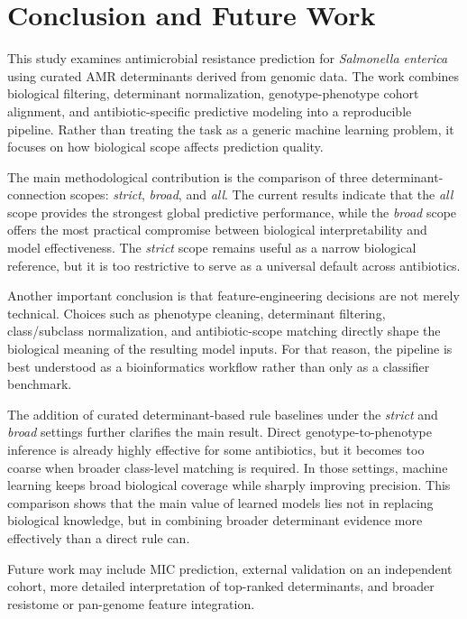 \chapter*{Conclusion and Future Work}

This study examines antimicrobial resistance prediction for \textit{Salmonella enterica} using curated AMR determinants derived from genomic data. The work combines biological filtering, determinant normalization, genotype-phenotype cohort alignment, and antibiotic-specific predictive modeling into a reproducible pipeline. Rather than treating the task as a generic machine learning problem, it focuses on how biological scope affects prediction quality.

The main methodological contribution is the comparison of three determinant-connection scopes: \textit{strict}, \textit{broad}, and \textit{all}. The current results indicate that the \textit{all} scope provides the strongest global predictive performance, while the \textit{broad} scope offers the most practical compromise between biological interpretability and model effectiveness. The \textit{strict} scope remains useful as a narrow biological reference, but it is too restrictive to serve as a universal default across antibiotics.

Another important conclusion is that feature-engineering decisions are not merely technical. Choices such as phenotype cleaning, determinant filtering, class/subclass normalization, and antibiotic-scope matching directly shape the biological meaning of the resulting model inputs. For that reason, the pipeline is best understood as a bioinformatics workflow rather than only as a classifier benchmark.

The addition of curated determinant-based rule baselines under the \textit{strict} and \textit{broad} settings further clarifies the main result. Direct genotype-to-phenotype inference is already highly effective for some antibiotics, but it becomes too coarse when broader class-level matching is required. In those settings, machine learning keeps broad biological coverage while sharply improving precision. This comparison shows that the main value of learned models lies not in replacing biological knowledge, but in combining broader determinant evidence more effectively than a direct rule can.

Future work may include MIC prediction, external validation on an independent cohort, more detailed interpretation of top-ranked determinants, and broader resistome or pan-genome feature integration.
